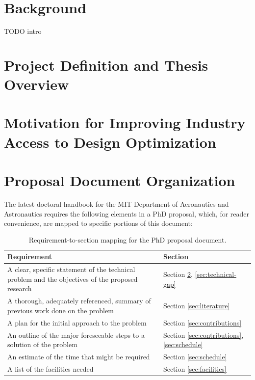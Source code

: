 \documentclass[12pt,vi,oneside]{report}
\begin{document}
    \section{Background}

    TODO intro


    \section{Project Definition and Thesis Overview}
    \label{sec:definition}


    \section{Motivation for Improving Industry Access to Design Optimization}


    \section{Proposal Document Organization}

    The latest doctoral handbook for the MIT Department of Aeronautics and Astronautics requires the following elements in a PhD proposal, which, for reader convenience, are mapped to specific portions of this document:

    \begingroup
    \renewcommand{\arraystretch}{1.5} %
    \begin{table}[H]
        \centering
        \caption{Requirement-to-section mapping for the PhD proposal document.}
        \label{tab:toc}
        \begin{tabular}{p{10cm}|p{4cm}}
            Requirement                                                                                      & Section                                               \\
            \hline
            A clear, specific statement of the technical problem and the objectives of the proposed research & Section \ref{sec:definition}, \ref{sec:technical-gap} \\
            A thorough, adequately referenced, summary of previous work done on the problem                  & Section \ref{sec:literature}                          \\
            A plan for the initial approach to the problem                                                   & Section \ref{sec:contributions}                       \\
            An outline of the major foreseeable steps to a solution of the problem                           & Section \ref{sec:contributions}, \ref{sec:schedule}   \\
            An estimate of the time that might be required                                                   & Section \ref{sec:schedule}                            \\
            A list of the facilities needed                                                                  & Section \ref{sec:facilities}                          \\
        \end{tabular}
    \end{table}
    \endgroup
\end{document}
